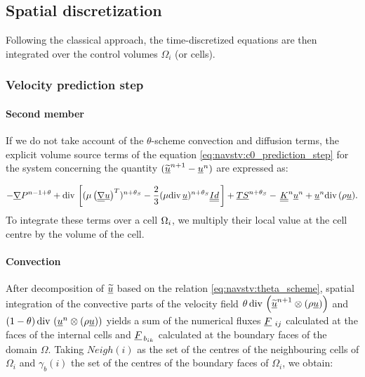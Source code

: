 \subsection*{Spatial discretization}
Following the classical approach, the time-discretized equations are then integrated over the control volumes ${\Omega_i}$ (or cells).
\subsubsection*{Velocity prediction step}
\paragraph{Second member\\ }
If we do not take account of the $\theta$-scheme convection and diffusion
terms, the explicit volume source terms of the equation \eqref{eq:navstv:c0_prediction_step}
for the system concerning the quantity $(\underline{\widetilde{u}}^{n+1}-\underline{u}^{n})$
        are expressed as:

\begin{equation*}
 -\underline{\nabla} P^{n-1+\theta} + \text{div}\, \left[ (\mu \left( \underline{\underline{\nabla}} \underline{u}\right) ^T)^{n+\theta_{S}}- \frac{2}{3} ( \mu  \text{div}\, \underline{u})^{n+\theta_{S}}\underline{\underline{Id}} \,\right]+\underline{TS}^{n+\theta_{S}}- \,\underline{\underline{K}}^{n} \underline{u}^{n}+\underline{u}^{n} \text{div}\,{(\rho\underline{u})}.
 \end{equation*}
To integrate these terms over a cell $\Omega_{i}$, we multiply their local value
at the cell centre by the volume of the cell.

\paragraph{Convection  \\}

After decomposition of $\underline{\widetilde{u}}$ based on the relation
\eqref{eq:navstv:theta_scheme}, spatial integration of the convective
parts of the velocity field $\theta\,{\text{div}\,\left(\underline{\widetilde{u}}^{n+1}\otimes
(\rho \underline{u})\right)}$ and $(1-\theta)\,{\text{div}\,\left(
\underline{u}^{n}\otimes (\rho \underline{u})\right)}$ yields a sum of the numerical
fluxes ${\underline{F}\,_{\,ij}}$ calculated at the faces of the internal cells and ${\underline{F}_{\,b_{ik}}}$ calculated at the boundary faces of the domain $\Omega$.
Taking $Neigh(i)$ as the set of the centres of the neighbouring cells of
${\Omega_i}$ and $\gamma_b(i)$ the set of the centres of the boundary faces of
${\Omega_i}$, we obtain:


